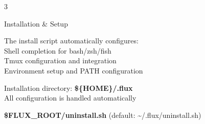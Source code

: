 \documentclass[10pt,a4paper]{article}
\begin{document}
\begin{multicols}{3}
\begin{textbox}{Installation \& Setup}

The install script automatically configures:\\

Shell completion for bash/zsh/fish\\

Tmux configuration and integration\\

Environment setup and PATH configuration\\


Installation directory: \textbf{\$\{HOME\}/.flux}\\

All configuration is handled automatically\\


\textbf{\$FLUX\_ROOT/uninstall.sh} (default: \textasciitilde/.flux/uninstall.sh)

\end{textbox}

\end{multicols}
\end{document}
